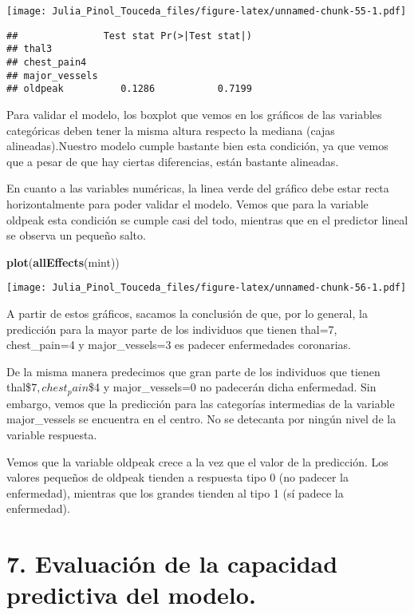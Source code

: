 \documentclass[]{article}
\newenvironment{Shaded}{\begin{snugshade}}{\end{snugshade}}
\newcommand{\KeywordTok}[1]{\textcolor[rgb]{0.13,0.29,0.53}{\textbf{#1}}}
\newcommand{\NormalTok}[1]{#1}
\begin{document}
\texttt{[image: Julia\_Pinol\_Touceda\_files/figure-latex/unnamed-chunk-55-1.pdf]}

\begin{verbatim}
##               Test stat Pr(>|Test stat|)
## thal3                                   
## chest_pain4                             
## major_vessels                           
## oldpeak          0.1286           0.7199
\end{verbatim}

Para validar el modelo, los boxplot que vemos en los gráficos de las
variables categóricas deben tener la misma altura respecto la mediana
(cajas alineadas).Nuestro modelo cumple bastante bien esta condición, ya
que vemos que a pesar de que hay ciertas diferencias, están bastante
alineadas.

En cuanto a las variables numéricas, la linea verde del gráfico debe
estar recta horizontalmente para poder validar el modelo. Vemos que para
la variable oldpeak esta condición se cumple casi del todo, mientras que
en el predictor lineal se observa un pequeño salto.

\begin{Shaded}
\begin{Highlighting}[]
\KeywordTok{plot}\NormalTok{(}\KeywordTok{allEffects}\NormalTok{(mint))}
\end{Highlighting}
\end{Shaded}

\texttt{[image: Julia\_Pinol\_Touceda\_files/figure-latex/unnamed-chunk-56-1.pdf]}

A partir de estos gráficos, sacamos la conclusión de que, por lo
general, la predicción para la mayor parte de los individuos que tienen
thal=7, chest\_pain=4 y major\_vessels=3 es padecer enfermedades
coronarias.

De la misma manera predecimos que gran parte de los individuos que
tienen thal\$\neq\(7, chest_pain\)\neq\$4 y major\_vessels=0 no
padecerán dicha enfermedad. Sin embargo, vemos que la predicción para
las categorías intermedias de la variable major\_vessels se encuentra en
el centro. No se detecanta por ningún nivel de la variable respuesta.

Vemos que la variable oldpeak crece a la vez que el valor de la
predicción. Los valores pequeños de oldpeak tienden a respuesta tipo 0
(no padecer la enfermedad), mientras que los grandes tienden al tipo 1
(sí padece la enfermedad).

\section{7. Evaluación de la capacidad predictiva del
modelo.}\label{evaluacion-de-la-capacidad-predictiva-del-modelo.}
\end{document}
